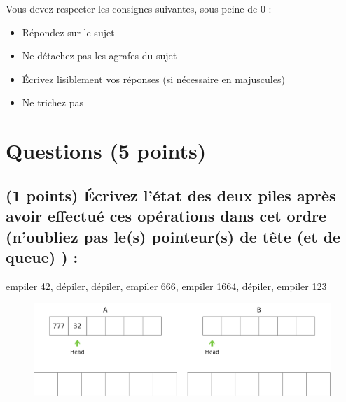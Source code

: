 \documentclass[11pt,a4paper]{article}
\begin{document}
\MakeExamTitle                   %


\bigskip
\bigskip

Vous devez respecter les consignes suivantes, sous peine de 0 :

\begin{itemize}
\item Répondez sur le sujet
\item Ne détachez pas les agrafes du sujet
\item \'Ecrivez lisiblement vos réponses (si nécessaire en majuscules)
\item Ne trichez pas
\end{itemize}

\bigskip


\section{Questions (5 points)}

\subsection{(1 points) \'Ecrivez l'état des deux piles après avoir effectué ces opérations dans cet ordre (n'oubliez pas le(s) pointeur(s) de tête (et de queue) ) : }

\bigskip

\vfill
\hspace{0pt}

\begin{center}

\begin{large}
empiler 42, dépiler, dépiler, empiler 666, empiler 1664, dépiler, empiler 123
\end{large}


\bigskip

\begin{figure}[ht!]
\centering
\centerline{  %
\includegraphics[scale=1]{img/Exercice1_bis.png}
}
\end{figure}

\end{center}
\end{document}
